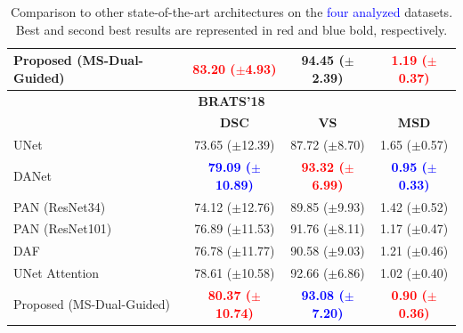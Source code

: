 \documentclass[journal]{IEEEtran}
\begin{document}
\begin{table}[t!]
\begin{tabular}{lccc}
Proposed (MS-Dual-Guided)  &  \textcolor{red}{\textbf{83.20 ($\pm$4.93)}} & 94.45 ($\pm$2.39) & \textcolor{red}{\textbf{1.19 ($\pm$0.37)}} \\
\midrule
\multicolumn{4}{c}{\textbf{BRATS'18}}\\
\midrule
 & \textbf{DSC} & \textbf{VS} & \textbf{MSD}\\
 \midrule
UNet \cite{ronneberger2015u}  & 73.65 ($\pm$12.39) & 87.72 ($\pm$8.70) & 1.65 ($\pm$0.57)\\
DANet \cite{fu2018dual}  &  \textcolor{blue}{\textbf{79.09 ($\pm$10.89)}} & \textcolor{red}{\textbf{93.32 ($\pm$6.99)}} &  \textcolor{blue}{\textbf{0.95 ($\pm$0.33)}} \\
PAN (ResNet34) \cite{li2018pyramid}    &  74.12 ($\pm$12.76) & 89.85 ($\pm$9.93) &  1.42 ($\pm$0.52) \\
PAN (ResNet101)\cite{li2018pyramid}   &  76.89 ($\pm$11.53)  & 91.76 ($\pm$8.11) & 1.17 ($\pm$0.47) \\
DAF \cite{wang18d}  &  76.78 ($\pm$11.77) & 90.58 ($\pm$9.03) &  1.21 ($\pm$0.46) \\
UNet Attention \cite{schlemper2019attention} &   78.61 ($\pm$10.58) & 92.66 ($\pm$6.86) & 1.02 ($\pm$0.40) \\
Proposed (MS-Dual-Guided)  &   \textcolor{red}{\textbf{80.37 ($\pm$10.74)}} & \textcolor{blue}{\textbf{93.08 ($\pm$7.20)}} &  \textcolor{red}{\textbf{0.90 ($\pm$0.36)}}\\
\midrule
\end{tabular}

\caption{Comparison to other state-of-the-art architectures on the \textcolor{blue}{four analyzed} datasets. Best and second best results are represented in red and blue bold, respectively. }
\label{table:sota_comp}
\end{table}
\end{document}
